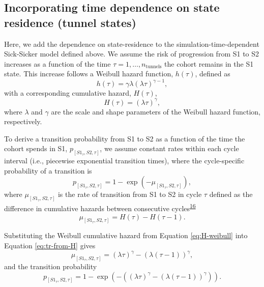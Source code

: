 \documentclass[
]{article}
\begin{document}
\hypertarget{incorporating-time-dependence-on-state-residence-tunnel-states}{%
\subsection{Incorporating time dependence on state residence (tunnel states)}\label{incorporating-time-dependence-on-state-residence-tunnel-states}}

Here, we add the dependence on state-residence to the simulation-time-dependent Sick-Sicker model defined above. We assume the risk of progression from S1 to S2 increases as a function of the time \(\tau = 1, \ldots, n_{\text{tunnels}}\) the cohort remains in the S1 state. This increase follows a Weibull hazard function, \(h(\tau)\), defined as
\[
  h(\tau) = \gamma \lambda (\lambda \tau)^{\gamma-1},
\]
with a corresponding cumulative hazard, \(H(\tau)\),
\begin{equation}
  H(\tau) = (\lambda \tau)^{\gamma},
\label{eq:H-weibull}
\end{equation}
where \(\lambda\) and \(\gamma\) are the scale and shape parameters of the Weibull hazard function, respectively.

To derive a transition probability from S1 to S2 as a function of the time the cohort spends in S1, \(p_{\left[S1_{\tau},S2, \tau\right]}\), we assume constant rates within each cycle interval (i.e., piecewise exponential transition times), where the cycle-specific probability of a transition is
\begin{equation}
  p_{\left[S1_{\tau},S2, \tau\right]} = 1-\exp{\left(-\mu_{\left[S1_{\tau},S2, \tau\right]}\right)},
\label{eq:tp-from-rate}
\end{equation}
where \(\mu_{\left[S1_{\tau},S2, \tau\right]}\) is the rate of transition from S1 to S2 in cycle \(\tau\) defined as the difference in cumulative hazards between consecutive cycles\textsuperscript{\protect\hyperlink{ref-Diaby2014}{16}}
\begin{equation}
  \mu_{\left[S1_{\tau},S2, \tau\right]} = H(\tau) - H(\tau-1).
\label{eq:tr-from-H}
\end{equation}

Substituting the Weibull cumulative hazard from Equation \eqref{eq:H-weibull} into Equation \eqref{eq:tr-from-H} gives
\begin{equation}
  \mu_{\left[S1_{\tau},S2, \tau\right]} = (\lambda \tau)^{\gamma} - (\lambda (\tau-1))^{\gamma},
\label{eq:tr-from-H-weibull}
\end{equation}
and the transition probability
\begin{equation}
  p_{\left[S1_{\tau},S2, \tau\right]} = 1-\exp{\left(- \left((\lambda \tau)^{\gamma} - (\lambda (\tau-1))^{\gamma}\right) \right)}.
\label{eq:tp-from-H-weibull}
\end{equation}
\end{document}
